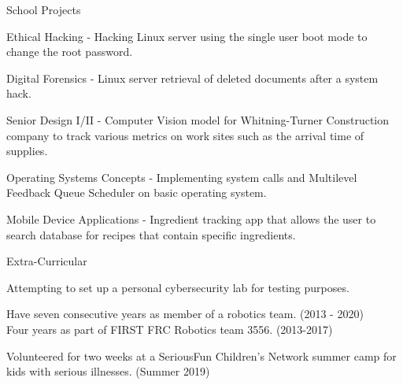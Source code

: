 \documentclass{resume} %
\begin{document}
\begin{rSection}{School Projects} \itemsep -3pt
	\item Ethical Hacking - Hacking Linux server using the single user boot mode to change the root password.
	\item Digital Forensics - Linux server retrieval of deleted documents after a system hack.
	\item Senior Design I/II - Computer Vision model for Whitning-Turner Construction company to track various metrics on work sites such as the arrival time of supplies.
	\item Operating Systems Concepts - Implementing system calls and Multilevel Feedback Queue Scheduler on basic operating system.
	\item Mobile Device Applications - Ingredient tracking app that allows the user to search database for recipes that contain specific ingredients.
\end{rSection}

\begin{rSection}{Extra-Curricular} \itemsep -3pt
	\item Attempting to set up a personal cybersecurity lab for testing purposes.
	\item Have seven consecutive years as member of a robotics team. (2013 - 2020)\\
	Four years as part of FIRST FRC Robotics team 3556. (2013-2017)
	\item Volunteered for two weeks at a SeriousFun Children's Network summer camp for kids with serious illnesses. (Summer 2019)
\end{rSection}

\end{document}
